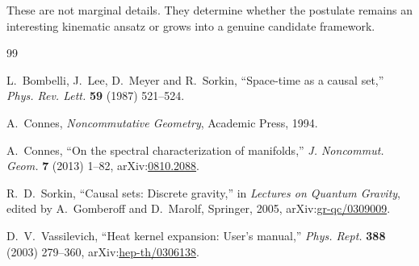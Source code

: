 \documentclass[12pt,a4paper]{article}
\theoremstyle{postulate}
\begin{document}
These are not marginal details.  They determine whether the postulate remains
an interesting kinematic ansatz or grows into a genuine candidate framework.

\begin{thebibliography}{99}

L.~Bombelli, J.~Lee, D.~Meyer and R.~Sorkin,
``Space-time as a causal set,''
\emph{Phys. Rev. Lett.} \textbf{59} (1987) 521--524.

A.~Connes,
\emph{Noncommutative Geometry},
Academic Press, 1994.

A.~Connes,
``On the spectral characterization of manifolds,''
\emph{J. Noncommut. Geom.} \textbf{7} (2013) 1--82,
arXiv:\href{https://arxiv.org/abs/0810.2088}{0810.2088}.

R.~D.~Sorkin,
``Causal sets: Discrete gravity,''
in \emph{Lectures on Quantum Gravity}, edited by A.~Gomberoff and
D.~Marolf, Springer, 2005,
arXiv:\href{https://arxiv.org/abs/gr-qc/0309009}{gr-qc/0309009}.

D.~V.~Vassilevich,
``Heat kernel expansion: User's manual,''
\emph{Phys. Rept.} \textbf{388} (2003) 279--360,
arXiv:\href{https://arxiv.org/abs/hep-th/0306138}{hep-th/0306138}.

\end{thebibliography}
\end{document}
